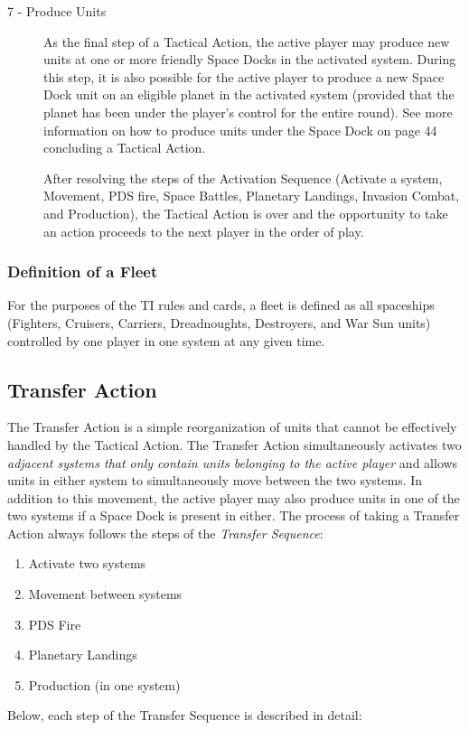 \documentclass[11pt,fleqn]{book} %
\begin{document}
\begin{description}
\item[7 - Produce Units]
As the final step of a Tactical Action, the active player may produce new units at one or more friendly Space Docks in the activated system. During this step, it is also possible for the active player to produce a new Space Dock unit on an eligible planet in the activated system (provided that the planet has been under the player’s control for the entire round). See more information on how to produce units under the Space Dock on page 44 concluding a Tactical Action.

After resolving the steps of the Activation Sequence (Activate a system, Movement, PDS fire, Space Battles, Planetary Landings, Invasion Combat, and Production), the Tactical Action is over and the opportunity to take an action proceeds to the next player in the order of play.

\end{description}
\begin{FFGbox}
    \subsubsection{Definition of a Fleet}
    For the purposes of the TI rules and cards, a fleet is defined as all spaceships (Fighters, Cruisers, Carriers, Dreadnoughts, Destroyers, and War Sun units) controlled by one player in one system at any given time.
\end{FFGbox}


\subsection{Transfer Action} %
\label{sub:transfer_action}
The Transfer Action is a simple reorganization of units that cannot be effectively handled by the Tactical Action. The Transfer Action simultaneously activates two \emph{adjacent systems that only contain units belonging to the active player} and allows units in either system to simultaneously move between the two systems. In addition to this movement, the active player may also produce units in one of the two systems if a Space Dock is present in either. The process of taking a Transfer Action always follows the steps of the \emph{Transfer Sequence}:
\begin{enumerate}
    \item Activate two systems
    \item Movement between systems
    \item PDS Fire
    \item Planetary Landings
    \item Production (in one system)
\end{enumerate}
Below, each step of the Transfer Sequence is described in detail:
\end{document}
